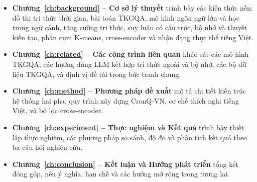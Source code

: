 \begin{itemize}
  \item \textbf{Chương~\ref{ch:background} -- Cơ sở lý thuyết} trình bày các kiến thức nền: đồ thị
  tri thức thời gian, bài toán TKGQA, mô hình ngôn ngữ lớn và học trong ngữ cảnh, tăng cường tri
  thức, suy luận có cấu trúc, bộ nhớ và thuyết kiến tạo, phân cụm K-means, cross-encoder và nhận
  dạng thực thể tiếng Việt.
  \item \textbf{Chương~\ref{ch:related} -- Các công trình liên quan} khảo sát các mô hình TKGQA,
  các hướng dùng LLM kết hợp tri thức ngoài và bộ nhớ, các bộ dữ liệu TKGQA, và định vị đề tài
  trong bức tranh chung.
  \item \textbf{Chương~\ref{ch:method} -- Phương pháp đề xuất} mô tả chi tiết kiến trúc hệ thống
  hai pha, quy trình xây dựng CronQ-VN, cơ chế thích nghi tiếng Việt, và bộ lọc cross-encoder.
  \item \textbf{Chương~\ref{ch:experiment} -- Thực nghiệm và Kết quả} trình bày thiết lập thực
  nghiệm, các phương pháp so sánh, độ đo và phân tích kết quả theo ba câu hỏi nghiên cứu.
  \item \textbf{Chương~\ref{ch:conclusion} -- Kết luận và Hướng phát triển} tổng kết đóng góp, nêu
  ý nghĩa, hạn chế và các hướng mở rộng trong tương lai.
\end{itemize}
